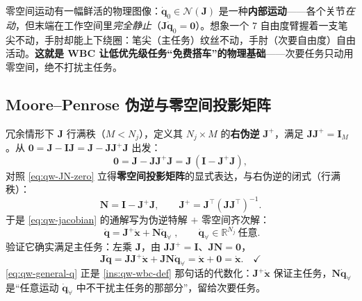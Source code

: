\begin{insight}\label{ins:qw-internal-motion}
零空间运动有一幅鲜活的物理图像：$\dot{\boldsymbol{q}}_0\in\mathcal{N}(\boldsymbol{J})$ 是一种\textbf{内部运动}——各个关节\emph{在动}，但末端在工作空间里\emph{完全静止}（$\boldsymbol{J}\dot{\boldsymbol{q}}_0=\mathbf{0}$）。想象一个 $7$ 自由度臂握着一支笔尖不动，手肘却能上下绕圈：笔尖（主任务）纹丝不动，手肘（次要自由度）自由活动。\textbf{这就是 WBC 让低优先级任务“免费搭车”的物理基础}——次要任务只动用零空间，绝不打扰主任务。
\end{insight}

\subsection{Moore--Penrose 伪逆与零空间投影矩阵}
\label{subsec:qw-pinv}

冗余情形下 $\boldsymbol{J}$ 行满秩（$M<N_j$），定义其 $N_j\times M$ 的\textbf{右伪逆} $\boldsymbol{J}^+$，满足 $\boldsymbol{J}\boldsymbol{J}^+=\mathbf{I}_M$。从 $\mathbf{0}=\boldsymbol{J}-\mathbf{I}\boldsymbol{J}=\boldsymbol{J}-\boldsymbol{J}\boldsymbol{J}^+\boldsymbol{J}$ 出发\cite{yu2021quadruped}：
\begin{equation}
  \mathbf{0}=\boldsymbol{J}-\boldsymbol{J}\boldsymbol{J}^+\boldsymbol{J}=\boldsymbol{J}\,(\mathbf{I}-\boldsymbol{J}^+\boldsymbol{J}),
  \label{eq:qw-pinv-zero}
\end{equation}
对照 \cref{eq:qw-JN-zero} 立得\textbf{零空间投影矩阵}的显式表达，与右伪逆的闭式（行满秩）：
\begin{equation}
  \boldsymbol{N}=\mathbf{I}-\boldsymbol{J}^+\boldsymbol{J},
  \qquad
  \boldsymbol{J}^+=\boldsymbol{J}^\top(\boldsymbol{J}\boldsymbol{J}^\top)^{-1}.
  \label{eq:qw-N-and-pinv}
\end{equation}
于是 \cref{eq:qw-jacobian} 的通解写为伪逆特解 $+$ 零空间齐次解\cite{yu2021quadruped}：
\begin{equation}
  \boxed{\;\dot{\boldsymbol{q}}=\boldsymbol{J}^+\dot{\boldsymbol{x}}+\boldsymbol{N}\dot{\boldsymbol{q}}_{\forall}\;},
  \qquad \dot{\boldsymbol{q}}_{\forall}\in\mathbb{R}^{N_j}\ \text{任意}.
  \label{eq:qw-general-q}
\end{equation}
验证它确实满足主任务：左乘 $\boldsymbol{J}$，由 $\boldsymbol{J}\boldsymbol{J}^+=\mathbf{I}$、$\boldsymbol{J}\boldsymbol{N}=\mathbf{0}$，
\begin{equation}
  \boldsymbol{J}\dot{\boldsymbol{q}}=\boldsymbol{J}\boldsymbol{J}^+\dot{\boldsymbol{x}}+\boldsymbol{J}\boldsymbol{N}\dot{\boldsymbol{q}}_{\forall}=\dot{\boldsymbol{x}}+\mathbf{0}=\dot{\boldsymbol{x}}.\quad\checkmark
  \label{eq:qw-verify}
\end{equation}
\cref{eq:qw-general-q} 正是 \cref{ins:qw-wbc-def} 那句话的代数化：$\boldsymbol{J}^+\dot{\boldsymbol{x}}$ 保证主任务，$\boldsymbol{N}\dot{\boldsymbol{q}}_{\forall}$ 是“任意运动 $\dot{\boldsymbol{q}}_{\forall}$ 中不干扰主任务的那部分”，留给次要任务。

